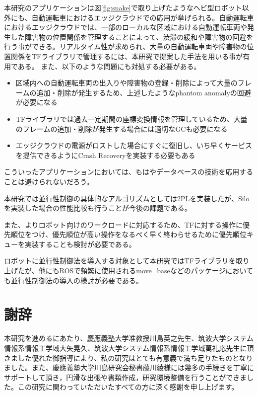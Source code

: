 \documentclass[a4paper]{jreport}	%
\begin{document}
本研究のアプリケーションは図\ref{fig:snake}で取り上げたようなヘビ型ロボット以外にも、自動運転車におけるエッジクラウドでの応用が挙げられる。自動運転車におけるエッジクラウドでは、一部のローカルな区域における自動運転車両や発生した障害物の位置関係を管理することによって、渋滞の緩和や障害物の回避を行う事ができる。リアルタイム性が求められ、大量の自動運転車両や障害物の位置関係をTFライブラリで管理するには、本研究で提案した手法を用いる事が有用である。
また、以下のような問題にも対処する必要がある。
\begin{itemize}     
	\item 区域内への自動運転車両の出入りや障害物の登録・削除によって大量のフレームの追加・削除が発生するため、上述したようなphantom anomalyの回避が必要になる
	\item TFライブラリでは過去一定期間の座標変換情報を管理しているため、大量のフレームの追加・削除が発生する場合には適切なGCも必要になる
	\item エッジクラウドの電源がロストした場合にすぐに復旧し、いち早くサービスを提供できるようにCrash Recoveryを実装する必要もある
\end{itemize}

こういったアプリケーションにおいては、もはやデータベースの技術を応用することは避けられないだろう。

本研究では並行性制御の具体的なアルゴリズムとしては2PLを実装したが、Siloを実装した場合の性能比較も行うことが今後の課題である。

また、よりロボット向けのワークロードに対応するため、TFに対する操作に優先順位をつけ、優先順位が高い操作をなるべく早く終わらせるために優先順位キューを実装することも検討が必要である。

ロボットに並行性制御法を導入する対象として本研究ではTFライブラリを取り上げたが、他にもROSで頻繁に使用されるmove\_baseなどのパッケージにおいても並行性制御法の導入の検討が必要である。

\chapter*{謝辞}

本研究を進めるにあたり、慶應義塾大学准教授川島英之先生、筑波大学システム情報系情報工学域大矢晃久、筑波大学システム情報系情報工学域萬礼応先生に頂きました優れた御指導により、私の研究はとても有意義で満ち足りたものとなりました。また、慶應義塾大学川島研究会秘書藤川綾様には幾多の手続きを丁寧にサポートして頂き，円滑な出張や書類作成，研究環境整備を行うことができました。この研究に関わっていただいたすべての方に深く感謝を申し上げます。
\end{document}
